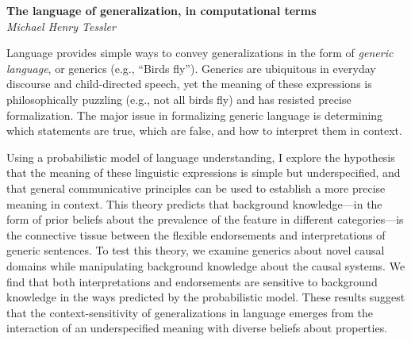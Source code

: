 \documentclass[10pt,letterpaper]{article}
\begin{document}
\noindent\textbf{The language of generalization, in computational terms} \\
\noindent\emph{Michael Henry Tessler}


Language provides simple ways to convey generalizations in the form of \emph{generic language}, or generics (e.g., ``Birds fly''). 
Generics are ubiquitous in everyday discourse and child-directed speech, yet the meaning of these expressions is philosophically puzzling (e.g., not all birds fly) and has resisted precise formalization. 
The major issue in formalizing generic language is determining which statements are true, which are false, and how to interpret them in context. 

Using a probabilistic model of language understanding, I explore the hypothesis that the meaning of these linguistic expressions is simple but underspecified, and that general communicative principles can be used to establish a more precise meaning in context. 
This theory predicts that background knowledge---in the form of prior beliefs about the prevalence of the feature in different categories---is the connective tissue between the flexible endorsements and interpretations of generic sentences. 
To test this theory, we examine generics about novel causal domains while manipulating background knowledge about the causal systems. 
We find that both interpretations and endorsements are sensitive to background knowledge in the ways predicted by the probabilistic model. 
These results suggest that the context-sensitivity of generalizations in language emerges from the interaction of an underspecified meaning with diverse beliefs about properties.

\end{document}
